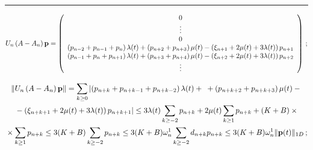 \hrule



{%
\begin{equation*}
U_n\left(A -A_n\right) {\bf p} =\left(\begin{array}{c}
0\\
\vdots \\
0 \\
\left(p_{n-2}+p_{n-1} +p_{n}\right)\lambda(t)+\left(p_{n+2}+p_{n+3}\right)\mu(t)-\left(\xi_{n+1}+2\mu(t)+3\lambda(t)\right)p_{n+1} \\
\left(p_{n-1}+p_n +p_{n+1}\right)\lambda(t)+\left(p_{n+3}+p_{n+4}\right)\mu(t)-\left(\xi_{n+2}+2\mu(t)+3\lambda(t)\right)p_{n+2} \\ \vdots
\end{array}\right)\,;
\end{equation*}}




\noindent
\begin{multline*}
\|U_n \left(A -A_n \right) {\bf p}\| =
\sum\limits_{k \ge 0}  \left| \left(p_{n+k}+p_{n+k-1} +p_{n+k-2}\right)\lambda(t)+{}\right.
{}+\left(p_{n+k+2}+p_{n+k+3}\right)\mu(t)-{}\\
\left.{}-  \left(\xi_{n+k+1}+2\mu(t)+3\lambda(t)\right)p_{n+k+1} \right|\le 
3\lambda(t)\sum\limits_{k \ge -2}{p_{n+k}}+2\mu(t)\sum\limits_{k \ge 1}{p_{n+k}}+
(K+B)\times{}\\
{}\times \sum\limits_{k \ge 1}{p_{n+k}}\le 
3(K+B)\sum\limits_{k \ge -2}{p_{n+k}} 
\le 3(K+B)\omega_n^1 
\sum\limits_{k \ge -2}{d_{n+k}p_{n+k}} 
\le   3(K+B)\omega_n^1 \| {\bf p}(t)\|_{1D} \,;
\end{multline*}




\begin{figure} %
\vspace*{1pt}
\begin{center}
\mbox{%
\epsfxsize=163.547mm
}
\end{center}
\vspace*{-3pt}
\begin{minipage}[t]{78mm}
\end{minipage}
\hfill
\begin{minipage}[t]{78mm}
\end{minipage}
\vspace*{12pt}
\end{figure}

